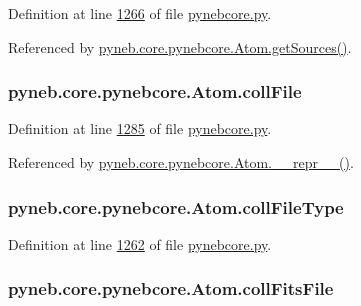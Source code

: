 Definition at line \hyperlink{pynebcore_8py_source_l01266}{1266} of file \hyperlink{pynebcore_8py_source}{pynebcore.\-py}.



Referenced by \hyperlink{pynebcore_8py_source_l01516}{pyneb.\-core.\-pynebcore.\-Atom.\-get\-Sources()}.

\hypertarget{classpyneb_1_1core_1_1pynebcore_1_1_atom_a356995bd5cadff6ea70cacb74f5c49e1}{
\subsubsection[{coll\-File}]{\setlength{\rightskip}{0pt plus 5cm}pyneb.\-core.\-pynebcore.\-Atom.\-coll\-File}}\label{classpyneb_1_1core_1_1pynebcore_1_1_atom_a356995bd5cadff6ea70cacb74f5c49e1}


Definition at line \hyperlink{pynebcore_8py_source_l01285}{1285} of file \hyperlink{pynebcore_8py_source}{pynebcore.\-py}.



Referenced by \hyperlink{pynebcore_8py_source_l02615}{pyneb.\-core.\-pynebcore.\-Atom.\-\_\-\-\_\-repr\-\_\-\-\_\-()}.

\hypertarget{classpyneb_1_1core_1_1pynebcore_1_1_atom_a8b68fc84abe84aa0b498c7dd995117db}{
\subsubsection[{coll\-File\-Type}]{\setlength{\rightskip}{0pt plus 5cm}pyneb.\-core.\-pynebcore.\-Atom.\-coll\-File\-Type}}\label{classpyneb_1_1core_1_1pynebcore_1_1_atom_a8b68fc84abe84aa0b498c7dd995117db}


Definition at line \hyperlink{pynebcore_8py_source_l01262}{1262} of file \hyperlink{pynebcore_8py_source}{pynebcore.\-py}.

\hypertarget{classpyneb_1_1core_1_1pynebcore_1_1_atom_a60a9c79fb04bee36371a0123fb5ae842}{
\subsubsection[{coll\-Fits\-File}]{\setlength{\rightskip}{0pt plus 5cm}pyneb.\-core.\-pynebcore.\-Atom.\-coll\-Fits\-File}}\label{classpyneb_1_1core_1_1pynebcore_1_1_atom_a60a9c79fb04bee36371a0123fb5ae842}


